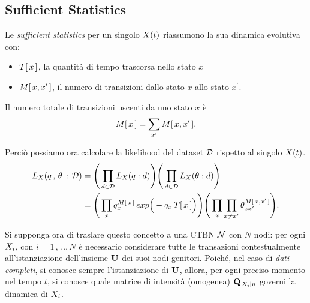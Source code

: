 \subsection{Sufficient Statistics}
\label{sec:ctbn-sufficient-stats}
Le \emph{sufficient statistics} per un singolo \homm\mprocess{} $\mathnormal{X}(t)$ riassumono la sua dinamica evolutiva con:
\begin{itemize}
    \item $T[\,x\,]$, la quantità di tempo trascorsa nello stato $x$
    \item $\mstat{x,x^\prime}$, il numero di transizioni dallo stato $x$ allo stato $x^\prime$.
\end{itemize}

Il numero totale di transizioni uscenti da uno stato $x$ è
\[
\mstat{x}=\sum_{x^\prime}\mstat{x,x^\prime}\text{.}
\]

Perciò possiamo ora calcolare la likelihood del dataset $\mathcal{D}$ rispetto al singolo $\mathnormal{X}(t)$.
\begin{equation}
\label{eq:ctbn-data-hmp-likelihood} 
\begin{split}
L_{\setel{X}}(q\,,\,\theta\,:\,\conceptsym{D}) &= \Bigg(\prod_{d\in\conceptsym{D}}L_{\setel{X}}(q:d) \Bigg)\Bigg(\prod_{d\in\conceptsym{D}}L_{\setel{X}}(\theta:d)\Bigg) \\
&= \Bigg(\prod_{x}q_x^{\mstat{x}}\,exp\Big(-q_x\,\tstat{x}\Big)\Bigg)\Bigg(\prod_{x}\prod_{x\neq x^{\prime}}\theta_{xx^{\prime}}^{\mstat{x,x^{\prime}}}\Bigg)\text{.}
\end{split}
\end{equation}

Si supponga ora di traslare questo concetto a una \acl{CTBN} $\mathcal{N}$ con $N$ nodi: per ogni $\mathnormal{X_i}$, con $i=1\,,\,\dotsc\,N$ è necessario considerare tutte le transazioni contestualmente all'istanziazione dell'insieme $\mathbf{U}$ dei suoi nodi genitori. Poiché, nel caso di \emph{dati completi}, si conosce sempre l'istanziazione di $\mathbf{U}$, allora, per ogni preciso momento nel tempo $t$, si conosce quale matrice di intensità (omogenea) $\mathbf{Q}_{\,\mathnormal{X_i}|\mathnormal{u}}$ governi la dinamica di $\mathnormal{X_i}$.

